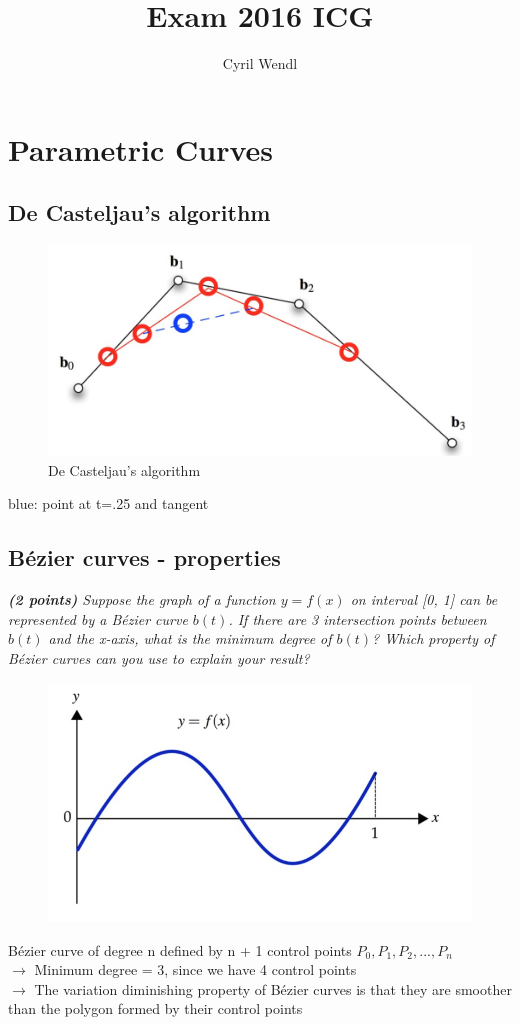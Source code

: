 \documentclass[a4paper,10pt]{article}
\author{Cyril Wendl}
\title{Exam 2016 ICG}
\begin{document}
\maketitle
\tableofcontents
\section{Parametric Curves}
\subsection{De Casteljau's algorithm}

\begin{figure}[H]
	\centering
	\includegraphics[width=.4\textwidth]{1-casteljau}
	\caption{De Casteljau's algorithm}
\end{figure}
blue: point at t=.25 and tangent\\
\subsection{Bézier curves - properties}
\textit{\textbf{(2 points)} Suppose the graph of a function $y = f (x)$ on interval [0, 1] can be represented by a Bézier curve $b(t)$. If there are 3 intersection points between $b(t)$ and the x-axis, what is the minimum degree of $b(t)$? Which property of Bézier curves can you use to explain your result?
}\\
\begin{figure}[H]
	\centering
	\includegraphics[width=.5\textwidth]{1-bezier}
\end{figure}

Bézier curve of degree n defined by n + 1 control points $P_0, P_1, P_2, ..., P_n$
\\$\rightarrow$ Minimum degree = 3, since we have 4 control points
\\$\rightarrow$ The variation diminishing property of Bézier curves is that they are smoother than the polygon formed by their control points
\end{document}
